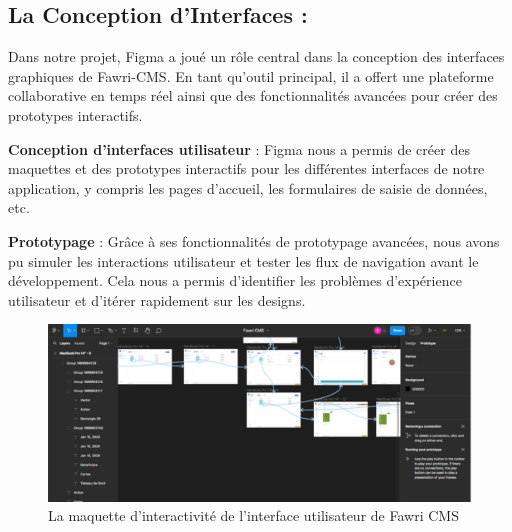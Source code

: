 \subsection{La Conception d'Interfaces :}

\hspace{\parindent}Dans notre projet, Figma a joué un rôle central dans la conception des interfaces graphiques de Fawri-CMS. En tant qu'outil principal, il a offert une plateforme collaborative en temps réel ainsi que des fonctionnalités avancées pour créer des prototypes interactifs.

\textbf{Conception d'interfaces utilisateur} : Figma nous a permis de créer des maquettes et des prototypes interactifs pour les différentes interfaces de notre application, y compris les pages d'accueil, les formulaires de saisie de données, etc.

\textbf{Prototypage} : Grâce à ses fonctionnalités de prototypage avancées, nous avons pu simuler les interactions utilisateur et tester les flux de navigation avant le développement. Cela nous a permis d'identifier les problèmes d'expérience utilisateur et d'itérer rapidement sur les designs.
\\
\begin{figure}[H] 
    \centering
    \includegraphics[width=17cm]{Figures/figma.PNG}
    \caption{La maquette d'interactivité de l'interface utilisateur de Fawri CMS}
\end{figure}

















